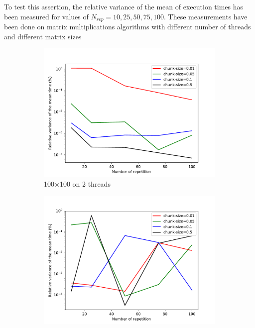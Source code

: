 To test this assertion, the relative variance of the mean of execution times has been measured for values of $N_{rep}=10,25,50,75,100$. These measurements have been done on matrix multiplications algorithms with different number of threads and different matrix sizes
\begin{figure}
	\centering
	\begin{subfigure}[b]{0.475\textwidth}
		\centering
		\includegraphics[width=\textwidth]{images/relvar_100_2.pdf}
		\caption[Network2]%
		{{\small 100$\times$100 on 2 threads}}    
	\end{subfigure}
	\hfill
	\begin{subfigure}[b]{0.475\textwidth}  
		\centering 
		\includegraphics[width=\textwidth]{images/relvar_500_2.pdf}

\end{subfigure}
\end{figure}
